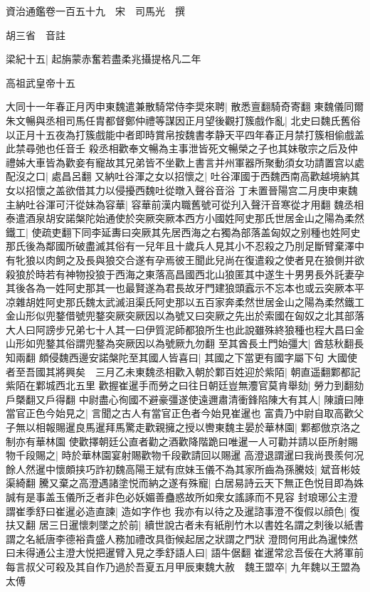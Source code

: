 資治通鑑卷一百五十九　宋　司馬光　撰

胡三省　音註

梁紀十五|{
	起旃蒙赤奮若盡柔兆攝提格凡二年}


高祖武皇帝十五

大同十一年春正月丙申東魏遣兼散騎常侍李奨來聘|{
	散悉亶翻騎奇寄翻}
東魏儀同爾朱文暢與丞相司馬任胄都督鄭仲禮等謀因正月望後觀打簇戲作亂|{
	北史曰魏氏舊俗以正月十五夜為打簇戲能中者即時賞帛按魏書孝静天平四年春正月禁打簇相偷戲盖此禁尋弛也任音壬}
殺丞相歡奉文暢為主事泄皆死文暢榮之子也其妹敬宗之后及仲禮姊大車皆為歡妾有寵故其兄弟皆不坐歡上書言并州軍器所聚動須女功請置宫以處配沒之口|{
	處昌呂翻}
又納吐谷渾之女以招懷之|{
	吐谷渾國于西魏西南高歡越境納其女以招懷之盖欲借其力以侵擾西魏吐從暾入聲谷音浴}
丁未置晉陽宫二月庚申東魏主納吐谷渾可汗從妹為容華|{
	容華前漢内職舊號可從刋入聲汗音寒從才用翻}
魏丞相泰遣酒泉胡安諾槃陀始通使於突厥突厥本西方小國姓阿史那氏世居金山之陽為柔然鐵工|{
	使疏吏翻下同李延夀曰突厥其先居西海之右獨為部落盖匈奴之别種也姓阿史那氏後為鄰國所破盡滅其俗有一兒年且十歲兵人見其小不忍殺之乃刖足斷臂棄澤中有牝狼以肉飼之及長與狼交合遂有孕焉彼王聞此兒尚在復遣殺之使者見在狼側并欲殺狼於時若有神物投狼于西海之東落高昌國西北山狼匿其中遂生十男男長外託妻孕其後各為一姓阿史那其一也最賢遂為君長故牙門建狼頭蠧示不忘本也或云突厥本平凉雜胡姓阿史那氏魏太武滅沮渠氏阿史那以五百家奔柔然世居金山之陽為柔然鐵工金山形似兜鍪借號兜鍪突厥突厥因以為號又曰突厥之先出於索國在匈奴之北其部落大人曰阿謗步兄弟七十人其一曰伊質泥師都狼所生也此說雖殊終狼種也程大昌曰金山形如兜鍪其俗謂兜鍪為突厥因以為號厥九勿翻}
至其酋長土門始彊大|{
	酋慈秋翻長知兩翻}
頗侵魏西邊安諾槃陀至其國人皆喜曰|{
	其國之下當更有國字屬下句}
大國使者至吾國其將興矣　三月乙未東魏丞相歡入朝於鄴百姓迎於紫陌|{
	朝直遥翻鄴都記紫陌在鄴城西北五里}
歡握崔暹手而勞之曰往日朝廷豈無灋官莫肯舉劾|{
	勞力到翻劾戶槩翻又戶得翻}
中尉盡心徇國不避豪彊遂使遠邇肅清衝鋒陷陳大有其人|{
	陳讀曰陣}
當官正色今始見之|{
	言聞之古人有當官正色者今始見崔暹也}
富貴乃中尉自取高歡父子無以相報賜暹良馬暹拜馬驚走歡親擁之授以轡東魏主晏於華林園|{
	鄴都倣京洛之制亦有華林園}
使歡擇朝廷公直者勸之酒歡降階跪曰唯暹一人可勸并請以臣所射賜物千段賜之|{
	時於華林園宴射賜歡物千段歡請回以賜暹}
高澄退謂暹曰我尚畏羨何况餘人然暹中懷頗挟巧詐初魏高陽王斌有庶妹玉儀不為其家所齒為孫騰妓|{
	斌音彬妓渠綺翻}
騰又棄之高澄遇諸塗悦而納之遂有殊寵|{
	白居易詩云天下無正色悦目即為姝誠有是事盖玉儀所乏者非色必妖媚善蠱惑故所如衆女謠諑而不見容}
封琅琊公主澄謂崔季舒曰崔暹必造直諫|{
	造如字作也}
我亦有以待之及暹諮事澄不復假以顔色|{
	復扶又翻}
居三日暹懷刺墜之於前|{
	續世說古者未有紙削竹木以書姓名謂之刺後以紙書謂之名紙唐李德裕貴盛人務加禮改具衘候起居之狀謂之門狀}
澄問何用此為暹悚然曰未得通公主澄大悦把暹臂入見之季舒語人曰|{
	語牛倨翻}
崔暹常忿吾佞在大將軍前每言叔父可殺及其自作乃過於吾夏五月甲辰東魏大赦　魏王盟卒|{
	九年魏以王盟為太傅}


